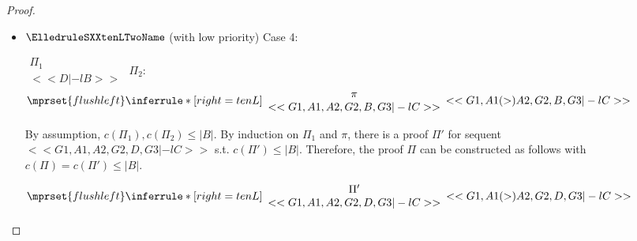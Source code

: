 \begin{proof}
\begin{enumerate}
\begin{itemize}
  \item $\ElledruleSXXtenLTwoName$ (with low priority) Case 4:
      \begin{center}
        \scriptsize
        \begin{math}
          \begin{array}{c}
            \Pi_1 \\
            {<<D |-l B>>}
          \end{array}
        \end{math}
        \qquad\qquad
        $\Pi_2$:
        \begin{math}
          $$\mprset{flushleft}
          \inferrule* [right={\tiny tenL}] {
            {
              \begin{array}{c}
                \pi \\
                {<<G1, A1, A2, G2, B, G3 |-l C>>}
              \end{array}
            }
          }{<<G1, A1 (>) A2, G2, B, G3 |-l C>>}
        \end{math}
      \end{center}
      By assumption, $c(\Pi_1),c(\Pi_2)\leq |B|$. By induction on $\Pi_1$ and $\pi$, there is
      a proof $\Pi'$ for sequent $<<G1, A1, A2, G2, D, G3 |-l C>>$ s.t. $c(\Pi') \leq |B|$.
      Therefore, the proof $\Pi$ can be constructed as follows with
      $c(\Pi) = c(\Pi') \leq |B|$.
      \begin{center}
        \scriptsize
        \begin{math}
          $$\mprset{flushleft}
          \inferrule* [right={\tiny tenL}] {
            {
              \begin{array}{c}
                \Pi' \\
                {<<G1, A1, A2, G2, D, G3 |-l C>>}
              \end{array}
            }
          }{<<G1, A1 (>) A2, G2, D, G3 |-l C>>}
        \end{math}
      \end{center}


\end{itemize}
\end{enumerate}
\end{proof}
